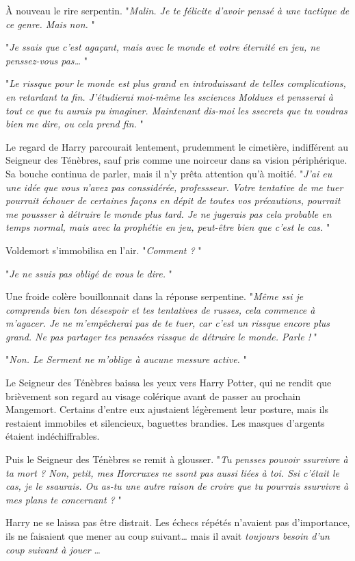 À nouveau le rire serpentin. "\emph{Malin. Je te félicite d'avoir penssé à une tactique de ce genre. Mais non.} "

"\emph{Je ssais que c'est agaçant, mais avec le monde et votre éternité en jeu, ne penssez-vous pas…} "

"\emph{Le rissque pour le monde est plus grand en introduissant de telles complications, en retardant ta fin. J'étudierai moi-même les ssciences Moldues et pensserai à tout ce que tu aurais pu imaginer. Maintenant dis-moi les ssecrets que tu voudras bien me dire, ou cela prend fin.} "

Le regard de Harry parcourait lentement, prudemment le cimetière, indifférent au Seigneur des Ténèbres, sauf pris comme une noirceur dans sa vision périphérique. Sa bouche continua de parler, mais il n'y prêta attention qu'à moitié. "\emph{J'ai eu une idée que vous n'avez pas conssidérée, professseur. Votre tentative de me tuer pourrait échouer de certaines façons en dépit de toutes vos précautions, pourrait me poussser à détruire le monde plus tard. Je ne jugerais pas cela probable en temps normal, mais avec la prophétie en jeu, peut-être bien que c'est le cas.} "

Voldemort s'immobilisa en l'air. "\emph{Comment ?} "

"\emph{Je ne ssuis pas obligé de vous le dire.} "

Une froide colère bouillonnait dans la réponse serpentine. "\emph{Même ssi je comprends bien ton désespoir et tes tentatives de russes, cela commence à m'agacer. Je ne m'empêcherai pas de te tuer, car c'est un rissque encore plus grand. Ne pas partager tes penssées rissque de détruire le monde. Parle !} "

"\emph{Non. Le Serment ne m'oblige à aucune messure active.} "

Le Seigneur des Ténèbres baissa les yeux vers Harry Potter, qui ne rendit que brièvement son regard au visage colérique avant de passer au prochain Mangemort. Certains d'entre eux ajustaient légèrement leur posture, mais ils restaient immobiles et silencieux, baguettes brandies. Les masques d'argents étaient indéchiffrables.

Puis le Seigneur des Ténèbres se remit à glousser. "\emph{Tu pensses pouvoir ssurvivre à ta mort ? Non, petit, mes Horcruxes ne ssont pas aussi liées à toi. Ssi c'était le cas, je le ssaurais. Ou as-tu une autre raison de croire que tu pourrais ssurvivre à mes plans te concernant ?} "

Harry ne se laissa pas être distrait. Les échecs répétés n'avaient pas d'importance, ils ne faisaient que mener au coup suivant… mais il avait \emph{toujours besoin d'un coup suivant à jouer} …


